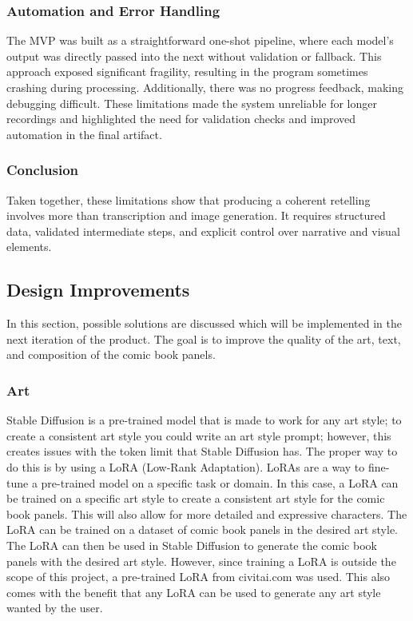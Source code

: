 \subsubsection{Automation and Error Handling}
The MVP was built as a straightforward one-shot pipeline, where each model's output was directly passed into the next without validation or fallback. This approach exposed significant fragility, resulting in the program sometimes crashing during processing. Additionally, there was no progress feedback, making debugging difficult. These limitations made the system unreliable for longer recordings and highlighted the need for validation checks and improved automation in the final artifact.

\subsubsection{Conclusion}
Taken together, these limitations show that producing a coherent retelling involves more than transcription and image generation. It requires structured data, validated intermediate steps, and explicit control over narrative and visual elements.

\subsection{Design Improvements}
In this section, possible solutions are discussed which will be implemented in the next iteration of the product. The goal is to improve the quality of the art, text, and composition of the comic book panels.

\subsubsection{Art}
Stable Diffusion is a pre-trained model that is made to work for any art style; to create a consistent art style you could write an art style prompt; however, this creates issues with the token limit that Stable Diffusion has. The proper way to do this is by using a LoRA (Low-Rank Adaptation). LoRAs are a way to fine-tune a pre-trained model on a specific task or domain. In this case, a LoRA can be trained on a specific art style to create a consistent art style for the comic book panels. This will also allow for more detailed and expressive characters. The LoRA can be trained on a dataset of comic book panels in the desired art style. The LoRA can then be used in Stable Diffusion to generate the comic book panels with the desired art style. However, since training a LoRA is outside the scope of this project, a pre-trained LoRA from civitai.com was used. This also comes with the benefit that any LoRA can be used to generate any art style wanted by the user.

